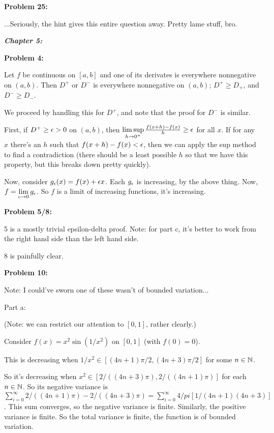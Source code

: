 \documentclass[a4paper,12pt]{article}
\begin{document}
\shunt

{\bf Problem 25:}

...Seriously, the hint gives this entire question away. Pretty lame stuff, bro.

\pagebreak

{\Huge{\textit{\textbf{Chapter 5:}}}}

\shunt

{\bf Problem 4:}

Let $f$ be continuous on $[a,b]$ and one of its derivates is everywhere nonnegative on $(a,b)$. Then $D^+$ or $D^-$ is everywhere nonnegative on $(a,b)$; $D^+ \geq D_+$, and $D^- \geq D_-$.

We proceed by handling this for $D^+$, and note that the proof for $D^-$ is similar.

First, if $D^+ \geq \epsilon >0$ on $(a,b)$, then $\limsup\limits_{h \to 0^+} \frac{f(x+h)-f(x)}{h} \geq \epsilon$ for all $x$. If for any $x$ there's an $h$ such that $f(x+h) -f(x) < \epsilon$, then we can apply the sup method to find a contradiction (there should be a least possible $h$ so that we have this property, but this breaks down pretty quickly). 

Now, consider $g_\epsilon(x) = f(x) + \epsilon x$. Each $g_\epsilon$ is increasing, by the above thing. Now, $f = \lim\limits_{\epsilon \to 0} g_\epsilon$. So $f$ is a limit of increasing functions, it's increasing.

\shunt

{\bf Problem 5/8:}

5 is a mostly trivial epsilon-delta proof. Note: for part c, it's better to work from the right hand side than the left hand side.

8 is painfully clear.

\shunt

{\bf Problem 10:}

Note: I could've sworn one of these wasn't of bounded variation...

Part a:

(Note: we can restrict our attention to $[0,1]$, rather clearly.)

Consider $f(x) = x^2\sin(1/x^2)$ on $[0,1]$ (with $f(0)=0$).

This is decreasing when $1/x^2 \in [(4n+1)\pi/2,(4n+3)\pi/2]$ for some $n \in \mathbb{N}$.

So it's decreasing when $x^2 \in [2/((4n+3)\pi),2/((4n+1)\pi)]$ for each $n \in \mathbb{N}$. So its negative variance is $\sum\limits_{i=0}^\infty 2/((4n+1)\pi) - 2/((4n+3)\pi) = \sum\limits_{i=0}^\infty 4/pi [1/(4n+1)(4n+3)]$. This sum converges, so the negative variance is finite. Similarly, the positive variance is finite. So the total variance is finite, the function is of bounded variation.
\end{document}
